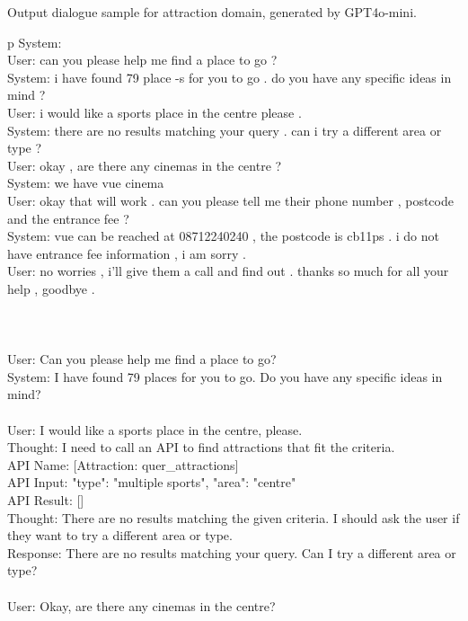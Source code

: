 \begin{table*}
\scriptsize
Output dialogue sample for attraction domain, generated by GPT4o-mini.
\centering
\ttfamily
\begin{tabular}{p\linewidth}
\toprule
System:  \\
User: can you please help me find a place to go ? \\
System: i have found 79 place -s for you to go . do you have any specific ideas in mind ? \\
User: i would like a sports place in the centre please . \\
System: there are no results matching your query . can i try a different area or type ? \\
User: okay , are there any cinemas in the centre ? \\
System: we have vue cinema \\
User: okay that will work . can you please tell me their phone number , postcode and the entrance fee ? \\
System: vue can be reached at 08712240240 , the postcode is cb11ps . i do not have entrance fee information , i am sorry . \\
User: no worries , i'll give them a call and find out . thanks so much for all your help , goodbye . \\
 \\
 \\
 \\
User: Can you please help me find a place to go? \\
System: I have found 79 places for you to go. Do you have any specific ideas in mind? \\
 \\
User: I would like a sports place in the centre, please. \\
Thought: I need to call an API to find attractions that fit the criteria. \\
API Name: [Attraction: quer\_attractions] \\
API Input: {"type": "multiple sports", "area": "centre"} \\
API Result: [] \\
Thought: There are no results matching the given criteria. I should ask the user if they want to try a different area or type. \\
Response: There are no results matching your query. Can I try a different area or type? \\
 \\
User: Okay, are there any cinemas in the centre? \\

\end{tabular}
\end{table*}

